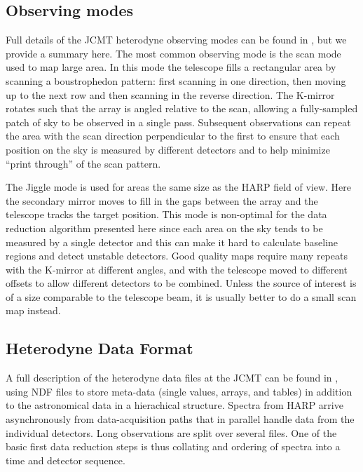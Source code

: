 \documentclass[final,authoryear,5p,times,twocolumn]{elsarticle}
\begin{document}
\subsection{Observing modes}
\label{sec:obsmodes}

Full details of the JCMT heterodyne observing modes can be found in
\citet{2009MNRAS.399.1026B}, but we provide a summary here. The most
common observing mode is the scan mode used to map large area. In this
mode the telescope fills a rectangular area by scanning a
boustrophedon pattern: first scanning in one direction, then moving up
to the next row and then scanning in the reverse direction. The
K-mirror rotates such that the array is angled relative to the scan,
allowing a fully-sampled patch of sky to be observed in a single
pass. Subsequent observations can repeat the area with the scan
direction perpendicular to the first to ensure that each position on
the sky is measured by different detectors and to help minimize
``print through'' of the scan pattern.

The Jiggle mode is used for areas the same size as the HARP field of
view. Here the secondary mirror moves to fill in the gaps between the
array and the telescope tracks the target position. This mode is
non-optimal for the data reduction algorithm presented here since each
area on the sky tends to be measured by a single detector and this can
make it hard to calculate baseline regions and detect unstable
detectors. Good quality maps require many repeats with the K-mirror
at different angles, and with the telescope moved to different offsets
 to allow different detectors to be combined. Unless the source of
 interest is of a size comparable to the telescope beam, it is usually
 better to do a small scan map instead.

\subsection{Heterodyne Data Format}
\label{sec:format}

A full description of the heterodyne data files at the JCMT can be
found in \citet{OCS_ICD_022}, using NDF files \citep{2015NDF} to store
meta-data (single values, arrays, and tables) in addition to the astronomical
data in a hierachical structure. Spectra from HARP arrive
asynchronously from data-acquisition paths that in parallel handle
data from the individual detectors. Long observations are split
over several files. One of the basic first data reduction steps is thus
collating and ordering of spectra into a time and detector sequence.
\end{document}
